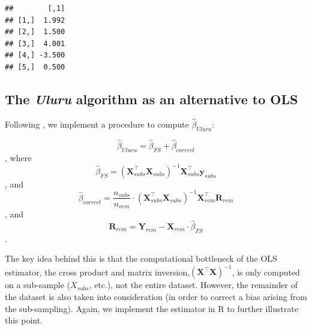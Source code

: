\documentclass[
  12pt,
]{style/krantz}
\begin{document}
\begin{verbatim}
##        [,1]
## [1,]  1.992
## [2,]  1.500
## [3,]  4.001
## [4,] -3.500
## [5,]  0.500
\end{verbatim}

\hypertarget{the-uluru-algorithm-as-an-alternative-to-ols}{%
\subsection{\texorpdfstring{The \emph{Uluru} algorithm as an alternative to OLS}{The Uluru algorithm as an alternative to OLS}}\label{the-uluru-algorithm-as-an-alternative-to-ols}}

Following \citet{dhillon_2013}, we implement a procedure to compute \(\hat{\beta}_{Uluru}\):

\[\hat{\beta}_{Uluru}=\hat{\beta}_{FS} + \hat{\beta}_{correct}\], where
\[\hat{\beta}_{FS} = (\mathbf{X}_{subs}^\intercal\mathbf{X}_{subs})^{-1}\mathbf{X}_{subs}^{\intercal}\mathbf{y}_{subs}\], and
\[\hat{\beta}_{correct}= \frac{n_{subs}}{n_{rem}} \cdot (\mathbf{X}_{subs}^\intercal\mathbf{X}_{subs})^{-1} \mathbf{X}_{rem}^{\intercal}\mathbf{R}_{rem}\], and
\[\mathbf{R}_{rem} = \mathbf{Y}_{rem} - \mathbf{X}_{rem}  \cdot \hat{\beta}_{FS}\].

The key idea behind this is that the computational bottleneck of the OLS estimator, the cross product and matrix inversion,\((\mathbf{X}^\intercal\mathbf{X})^{-1}\), is only computed on a sub-sample (\(X_{subs}\), etc.), not the entire dataset. However, the remainder of the dataset is also taken into consideration (in order to correct a bias arising from the sub-sampling). Again, we implement the estimator in R to further illustrate this point.
\end{document}
